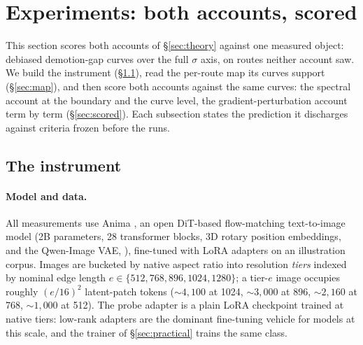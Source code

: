 \section{Experiments: both accounts, scored}
\label{sec:evidence}

This section scores both accounts of \S\ref{sec:theory} against one
measured object: debiased demotion-gap curves over the full $\sigma$
axis, on routes neither account saw. We build the instrument
(\S\ref{sec:instrument}), read the per-route map its curves support
(\S\ref{sec:map}), and then score both
accounts against the same curves: the spectral account at the
boundary and the curve level, the gradient-perturbation account term
by term (\S\ref{sec:scored}). Each subsection states the prediction
it discharges against criteria frozen before the runs.

\subsection{The instrument}
\label{sec:instrument}

\paragraph{Model and data.}
All measurements use Anima \citep{circlestone2025anima}, an open
DiT-based flow-matching text-to-image model (2B parameters, 28
transformer blocks, 3D rotary position embeddings, and the Qwen-Image
VAE, \citealp{wu2025qwenimage}), fine-tuned with LoRA adapters on an
illustration corpus. Images are bucketed by native aspect ratio into
resolution \emph{tiers} indexed by nominal edge length
$e \in \{512, 768, 896, 1024, 1280\}$; a tier-$e$ image occupies roughly
$(e/16)^2$ latent-patch tokens (${\sim}4{,}100$ at 1024, ${\sim}3{,}000$
at 896, ${\sim}2{,}160$ at 768, ${\sim}1{,}000$ at 512). The probe
adapter is a plain LoRA \citep{hu2022lora} checkpoint trained at
native tiers: low-rank adapters are the dominant fine-tuning vehicle
for models at this scale, and the trainer of \S\ref{sec:practical}
trains the same class.

